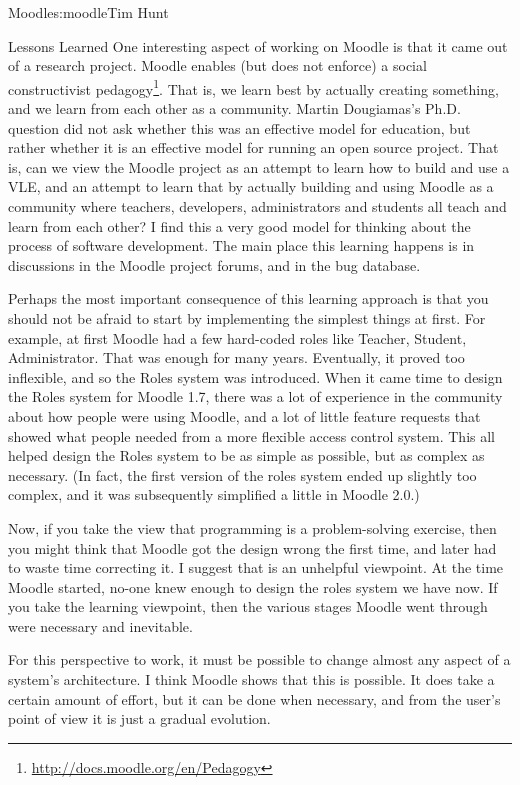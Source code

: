 \begin{aosachapter}{Moodle}{s:moodle}{Tim Hunt}
\begin{aosasect1}{Lessons Learned}
One interesting aspect of working on Moodle is that it came out of a
research project. Moodle enables (but does not enforce) a social
constructivist
pedagogy\footnote{\url{http://docs.moodle.org/en/Pedagogy}}. That is,
we learn best by actually creating something, and we learn from each
other as a community. Martin Dougiamas's Ph.D. question did not ask
whether this was an effective model for education, but rather 
whether it is an effective model for running an open source
project. That is, can we view the Moodle project as an attempt to
learn how to build and use a VLE, and an attempt to learn that by
actually building and using Moodle as a community where teachers,
developers, administrators and students all teach and learn from each
other? I find this a very good model for thinking about the
process of software development. The main place this learning
happens is in discussions in the Moodle project forums, and in the bug
database.

Perhaps the most important consequence of this learning approach is
that you should not be afraid to start by implementing the simplest
things at first. For example, at first Moodle had a few
hard-coded roles like Teacher, Student, Administrator. That was enough
for many years. Eventually, it proved too inflexible, and so the Roles
system was introduced. When it came time to design the Roles system
for Moodle 1.7, there was a lot of experience in the community about
how people were using Moodle, and a lot of little feature requests
that showed what people needed from a more flexible access control
system. This all helped design the Roles system to be as simple as
possible, but as complex as necessary. (In fact, the first version of
the roles system ended up slightly too complex, and it was
subsequently simplified a little in Moodle 2.0.)

Now, if you take the view that programming is a problem-solving
exercise, then you might think that Moodle got the design wrong the
first time, and later had to waste time correcting it. I suggest that
is an unhelpful viewpoint. At the time Moodle started, no-one knew
enough to design the roles system we have now. If you take the
learning viewpoint, then the various stages Moodle went through were
necessary and inevitable.

For this perspective to work, it must be possible to change almost any aspect of a
system's architecture. I think Moodle shows that this is possible. It
does take a certain amount of effort, but it can be done when
necessary, and from the user's point of view it is just a gradual
evolution.

\end{aosasect1}

\end{aosachapter}
